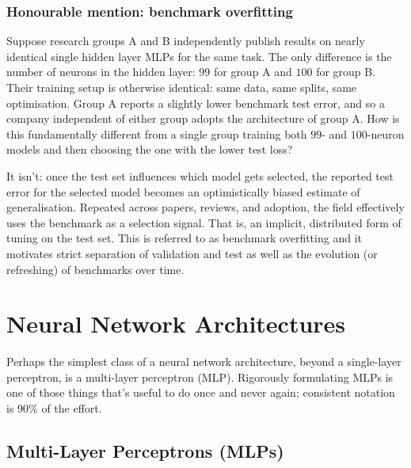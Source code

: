 \documentclass[11pt]{article}
\begin{document}
\subsubsection{Honourable mention: benchmark overfitting}
Suppose research groups A and B independently publish results on nearly identical single hidden layer MLPs for the same task. The only difference is the number of neurons in the hidden layer: $99$ for group A and $100$ for group B. Their training setup is otherwise identical: same data, same splits, same optimisation. Group A reports a slightly lower benchmark test error, and so a company independent of either group adopts the architecture of group A. How is this fundamentally different from a single group training both $99$- and $100$-neuron models and then choosing the one with the lower test loss?

It isn't: once the test set influences which model gets selected, the reported test error for the selected model becomes an optimistically biased estimate of generalisation. Repeated across papers, reviews, and adoption, the field effectively uses the benchmark as a selection signal. That is, an implicit, distributed form of tuning on the test set. This is referred to as benchmark overfitting and it motivates strict separation of validation and test as well as the evolution (or refreshing) of benchmarks over time.


\section{Neural Network Architectures}
Perhaps the simplest class of a neural network architecture, beyond a single-layer perceptron, is a multi-layer perceptron (MLP). Rigorously formulating MLPs is one of those things that's useful to do once and never again; consistent notation is $90\%$ of the effort.

\subsection{Multi-Layer Perceptrons (MLPs)}
\label{sec:multi_layer_perceptrons}
\end{document}
